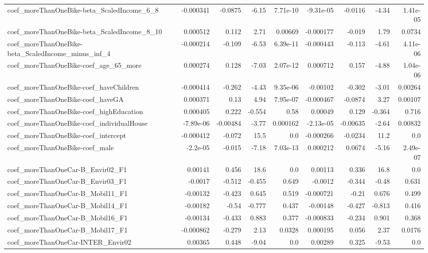 \begin{tabular}{lrrrrrrrr}
coef_moreThanOneBike-beta_ScaledIncome_6_8 & -0.000341 & -0.0875 & -6.15 & 7.71e-10 & -9.31e-05 & -0.0116 & -4.34 & 1.41e-05 \\
coef_moreThanOneBike-beta_ScaledIncome_8_10 & 0.000512 & 0.112 & 2.71 & 0.00669 & -0.000177 & -0.019 & 1.79 & 0.0734 \\
coef_moreThanOneBike-beta_ScaledIncome_minus_inf_4 & -0.000214 & -0.109 & -6.53 & 6.39e-11 & -0.000443 & -0.113 & -4.61 & 4.11e-06 \\
coef_moreThanOneBike-coef_age_65_more & 0.000274 & 0.128 & -7.03 & 2.07e-12 & 0.000712 & 0.157 & -4.88 & 1.04e-06 \\
coef_moreThanOneBike-coef_haveChildren & -0.000414 & -0.262 & -4.43 & 9.35e-06 & -0.00102 & -0.302 & -3.01 & 0.00264 \\
coef_moreThanOneBike-coef_haveGA & 0.000371 & 0.13 & 4.94 & 7.95e-07 & -0.000467 & -0.0874 & 3.27 & 0.00107 \\
coef_moreThanOneBike-coef_highEducation & 0.000405 & 0.222 & -0.554 & 0.58 & 0.00049 & 0.129 & -0.364 & 0.716 \\
coef_moreThanOneBike-coef_individualHouse & -7.89e-06 & -0.00484 & -3.77 & 0.000162 & -2.13e-05 & -0.00635 & -2.64 & 0.00832 \\
coef_moreThanOneBike-coef_intercept & -0.000412 & -0.072 & 15.5 & 0.0 & -0.000266 & -0.0234 & 11.2 & 0.0 \\
coef_moreThanOneBike-coef_male & -2.2e-05 & -0.015 & -7.18 & 7.03e-13 & 0.000212 & 0.0674 & -5.16 & 2.49e-07 \\
coef_moreThanOneCar-B_Envir02_F1 & 0.00141 & 0.456 & 18.6 & 0.0 & 0.00113 & 0.336 & 16.8 & 0.0 \\
coef_moreThanOneCar-B_Envir03_F1 & -0.0017 & -0.512 & -0.455 & 0.649 & -0.0012 & -0.344 & -0.48 & 0.631 \\
coef_moreThanOneCar-B_Mobil11_F1 & -0.00132 & -0.423 & 0.645 & 0.519 & -0.000721 & -0.21 & 0.676 & 0.499 \\
coef_moreThanOneCar-B_Mobil14_F1 & -0.00182 & -0.54 & -0.777 & 0.437 & -0.00148 & -0.427 & -0.813 & 0.416 \\
coef_moreThanOneCar-B_Mobil16_F1 & -0.00134 & -0.433 & 0.883 & 0.377 & -0.000833 & -0.234 & 0.901 & 0.368 \\
coef_moreThanOneCar-B_Mobil17_F1 & -0.000862 & -0.279 & 2.13 & 0.0328 & 0.000195 & 0.056 & 2.37 & 0.0176 \\
coef_moreThanOneCar-INTER_Envir02 & 0.00365 & 0.448 & -9.04 & 0.0 & 0.00289 & 0.325 & -9.53 & 0.0 \\

\end{tabular}
